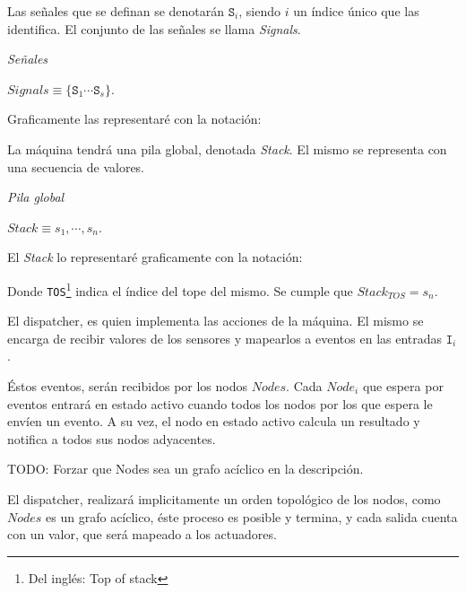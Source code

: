   

  Las señales que se definan se denotarán $\texttt{S}_i$, siendo $i$ un
  índice único que las identifica. El conjunto de las señales se llama
  \textit{Signals}.

\begin{definicion}
  \textit{Señales}
  \begin{center}
    $\textit{Signals} \equiv \{\texttt{S}_1 \dotsb \texttt{S}_s\}$.
  \end{center}
\end{definicion}

  Graficamente las representaré con la notación:

  

  La máquina tendrá una pila global, denotada \textit{Stack}. El mismo
  se representa con una secuencia de valores.

\begin{definicion}
  \textit{Pila global}
  \begin{center}
    $\textit{Stack} \equiv s_1, \dotsb, s_n$.
  \end{center}
\end{definicion}

  El \textit{Stack} lo representaré graficamente con la notación:

  

  Donde \texttt{TOS}\footnote{Del inglés: Top
  of stack} indica el índice del tope del mismo.
  Se cumple que $\textit{Stack}_{TOS} = s_n$.




  El dispatcher, es quien implementa las acciones de la máquina.
  El mismo se encarga de recibir valores de los sensores y mapearlos
  a eventos en las entradas $\texttt{I}_i$.

  Éstos eventos, serán recibidos por los nodos $Nodes$.
  Cada $Node_i$ que espera por eventos entrará en estado activo cuando
todos los nodos por los que espera le envíen un evento.
  A su vez, el nodo en estado activo calcula un resultado y notifica a
todos sus nodos adyacentes.

  TODO: Forzar que Nodes sea un grafo acíclico en la descripción.

  El dispatcher, realizará implicitamente un orden topológico de los
nodos, como $Nodes$ es un grafo acíclico, éste proceso es posible y
termina, y cada salida cuenta con un valor, que será mapeado a los actuadores.

